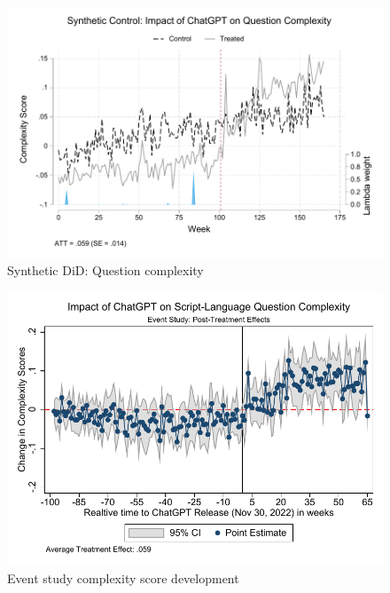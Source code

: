 \begin{figure}[H]
    \centering
    \includegraphics[width=1\linewidth]{imgs/stata/sdid_nlp_trends101.pdf}
    \caption{Synthetic DiD: Question complexity}
    \label{fig:app-cscore_synthetic_control}
\end{figure}

\begin{figure}[H]
    \centering
    \includegraphics[width=1\linewidth]{imgs/stata/event_study_nlp.pdf}
    \caption{Event study complexity score development}
    \label{fig:app-cscore_event_study}
\end{figure}

